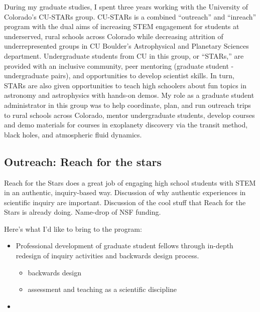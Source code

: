 \documentclass[aasms,12pt]{article}
\begin{document}
During my graduate studies, I spent three years working with the University of Colorado's CU-STARs group.
CU-STARs is a combined ``outreach'' and ``inreach'' program with the dual aims of increasing STEM engagement for students at underserved, rural schools across Colorado while decreasing attrition of underrepresented groups in CU Boulder's Astrophysical and Planetary Sciences department.
Undergraduate students from CU in this group, or ``STARs,'' are provided with an inclusive community, peer mentoring (graduate student - undergraduate pairs), and opportunities to develop scientist skills.
In turn, STARs are also given opportunities to teach high schoolers about fun topics in astronomy and astrophysics with hands-on demos.
My role as a graduate student administrator in this group was to help coordinate, plan, and run outreach trips to rural schools across Colorado, mentor undergraduate students, develop courses and demo materials for courses in exoplanety discovery via the transit method, black holes, and atmospheric fluid dynamics.



\subsection{Outreach: Reach for the stars}
Reach for the Stars does a great job of engaging high school students with STEM in an authentic, inquiry-based way.
Discussion of why authentic experiences in scientific inquiry are important.
Discussion of the cool stuff that Reach for the Stars is already doing.
Name-drop of NSF funding.

Here's what I'd like to bring to the program:
\begin{itemize}
\item Professional development of graduate student fellows through in-depth redesign of inquiry activities and backwards design process.
\begin{itemize}
\item backwards design
\item assessment and teaching as a scientific discipline
\end{itemize}
\item 
\end{itemize}
\end{document}
